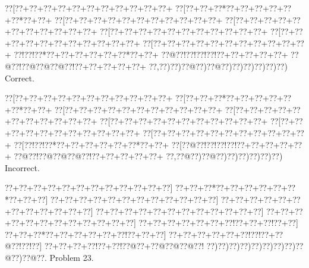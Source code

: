 \documentclass[a5paper]{article}
\begin{document}
\begin{center}
{\goo
\0??[\0??+\0??+\0??+\0??+\0??+\0??+\0??+\0??+\0??+\0??+\0??+
\0??[\0??+\0??+\0??*\0??+\0??+\0??+\0??+\0??+\0??*\0??+\0??+
\0??[\0??+\0??+\0??+\0??+\0??+\0??+\0??+\0??+\0??+\0??+\0??+
\0??[\0??+\0??+\0??+\0??+\0??+\0??+\0??+\0??+\0??+\0??+\0??+
\0??[\0??+\0??+\0??+\0??+\0??+\0??+\0??+\0??+\0??+\0??+\0??+
\0??[\0??+\0??+\0??+\0??+\0??+\0??+\0??+\0??+\0??+\0??+\0??+
\0??[\0??+\0??+\0??+\0??+\0??+\0??+\0??+\0??+\0??+\0??+\0??+
\0??!\0??!\0??*\0??+\0??+\0??+\0??+\0??+\0??*\0??+\0??+
\0??@\0??!\0??!\0??!\0??!\0??+\0??+\0??+\0??+\0??+
\0??@\0??!\0??@\0??@\0??@\0??!\0??+\0??+\0??+\0??+\0??+
\0??,\0??)\0??)\0??@\0??)\0??@\0??)\0??)\0??)\0??)\0??)\0??)
}
Correct. 

\end{center}
\begin{center}
{\goo
\0??[\0??+\0??+\0??+\0??+\0??+\0??+\0??+\0??+\0??+\0??+\0??+
\0??[\0??+\0??+\0??*\0??+\0??+\0??+\0??+\0??+\0??*\0??+\0??+
\0??[\0??+\0??+\0??+\0??+\0??+\0??+\0??+\0??+\0??+\0??+\0??+
\0??[\0??+\0??+\0??+\0??+\0??+\0??+\0??+\0??+\0??+\0??+\0??+
\0??[\0??+\0??+\0??+\0??+\0??+\0??+\0??+\0??+\0??+\0??+\0??+
\0??[\0??+\0??+\0??+\0??+\0??+\0??+\0??+\0??+\0??+\0??+\0??+
\0??[\0??+\0??+\0??+\0??+\0??+\0??+\0??+\0??+\0??+\0??+\0??+
\0??[\0??!\0??!\0??*\0??+\0??+\0??+\0??+\0??+\0??*\0??+\0??+
\0??[\0??@\0??!\0??!\0??!\0??!\0??+\0??+\0??+\0??+\0??+
\0??@\0??!\0??@\0??@\0??@\0??!\0??+\0??+\0??+\0??+\0??+
\0??,\0??@\0??)\0??@\0??)\0??)\0??)\0??)\0??)\0??)
}
Incorrect. 

\end{center}
\newpage
\begin{center}
{\goo
\0??+\0??+\0??+\0??+\0??+\0??+\0??+\0??+\0??+\0??+\0??+\0??]
\0??+\0??+\0??*\0??+\0??+\0??+\0??+\0??+\0??*\0??+\0??+\0??]
\0??+\0??+\0??+\0??+\0??+\0??+\0??+\0??+\0??+\0??+\0??+\0??]
\0??+\0??+\0??+\0??+\0??+\0??+\0??+\0??+\0??+\0??+\0??+\0??]
\0??+\0??+\0??+\0??+\0??+\0??+\0??+\0??+\0??+\0??+\0??+\0??]
\0??+\0??+\0??+\0??+\0??+\0??+\0??+\0??+\0??+\0??+\0??+\0??]
\0??+\0??+\0??+\0??+\0??+\0??+\0??!\0??+\0??+\0??!\0??+\0??]
\0??+\0??+\0??*\0??+\0??+\0??+\0??+\0??+\0??!\0??+\0??+\0??]
\0??+\0??+\0??+\0??+\0??+\0??!\0??!\0??+\0??@\0??!\0??!\0??]
\0??+\0??+\0??+\0??!\0??+\0??!\0??@\0??+\0??@\0??@\0??@\0??!
\0??)\0??)\0??)\0??)\0??)\0??)\0??)\0??)\0??@\0??)\0??@\0??.
}
Problem 23.

\end{center}
\end{document}
